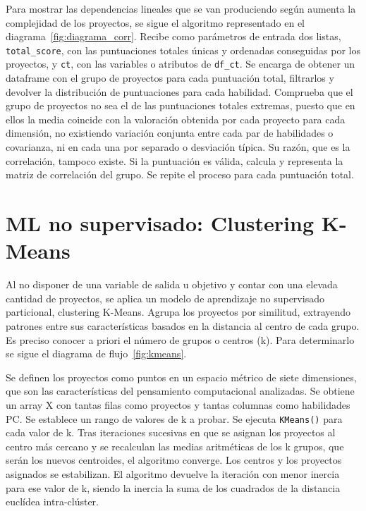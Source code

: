 \documentclass[a4paper, 12pt]{book}
\begin{document}
Para mostrar las dependencias lineales que se van produciendo según aumenta la complejidad de los proyectos, se sigue el algoritmo representado en el diagrama~\ref{fig:diagrama_corr}. Recibe como parámetros de entrada dos listas, \texttt{total\_score}, con las puntuaciones totales únicas y ordenadas conseguidas por los proyectos, y \texttt{ct}, con las variables o atributos de \texttt{df\_ct}. Se encarga de obtener un dataframe con el grupo de proyectos para cada puntuación total, filtrarlos y devolver la distribución de puntuaciones para cada habilidad. Comprueba que el grupo de proyectos no sea el de las puntuaciones totales extremas, puesto que en ellos la media coincide con la valoración obtenida por cada proyecto para cada dimensión, no existiendo variación conjunta entre cada par de habilidades o covarianza, ni en cada una por separado o desviación típica. Su razón, que es la correlación, tampoco existe. Si la puntuación es válida, calcula y representa la matriz de correlación del grupo. Se repite el proceso para cada puntuación total. 

\section{ML no supervisado: Clustering K-Means}  
\label{sec:k_means diseño}

Al no disponer de una variable de salida u objetivo y contar con una elevada cantidad de proyectos, se aplica un modelo de aprendizaje no supervisado particional, clustering K-Means. Agrupa los proyectos por similitud, extrayendo patrones entre sus características basados en la  distancia al centro de cada grupo. Es preciso conocer a priori el número de grupos o centros (k). Para determinarlo se sigue el diagrama de flujo~\ref{fig:kmeans}. 

Se definen los proyectos como puntos en un espacio métrico de siete dimensiones, que son las características del pensamiento computacional analizadas. Se obtiene un array X con tantas filas como proyectos y tantas columnas como habilidades PC. Se establece un rango de valores de k a probar. Se ejecuta \texttt{KMeans()} para cada valor de k. Tras iteraciones sucesivas en que se asignan los proyectos al centro más cercano y se recalculan las medias aritméticas de los k grupos, que serán los nuevos centroides, el algoritmo converge. Los centros y los proyectos asignados se estabilizan. El algoritmo devuelve la iteración con menor inercia para ese valor de k, siendo la inercia la suma de los cuadrados de la distancia euclídea intra-clúster.
\end{document}
